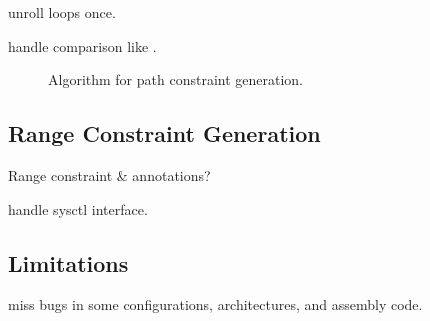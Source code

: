 unroll loops once.

handle comparison like .

\begin{figure}

\caption{Algorithm for path constraint generation.}
\label{f:path-cstr}
\end{figure}

\subsection{Range Constraint Generation}

Range constraint \& annotations?

handle sysctl interface.

\subsection{Limitations}

miss bugs in some configurations, architectures,
and assembly code.
